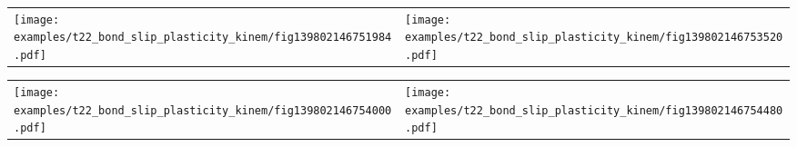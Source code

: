 \documentclass[main.tex]{subfiles}
\begin{document}
\begin{bmcsexample}
\begin{center}
\end{center}

\noindent
\begin{tabular}{L{7.5cm}L{7.5cm}}
\texttt{[image: examples/t22\_bond\_slip\_plasticity\_kinem/fig139802146751984.pdf]}
 & 
\texttt{[image: examples/t22\_bond\_slip\_plasticity\_kinem/fig139802146753520.pdf]}
 \\\end{tabular}

\noindent
\begin{tabular}{L{7.5cm}L{7.5cm}}
\texttt{[image: examples/t22\_bond\_slip\_plasticity\_kinem/fig139802146754000.pdf]}
 & 
\texttt{[image: examples/t22\_bond\_slip\_plasticity\_kinem/fig139802146754480.pdf]}
 \\\end{tabular}

\end{bmcsexample}
\end{document}
